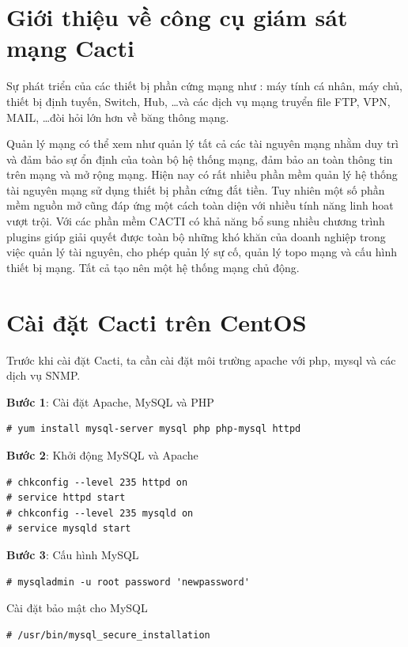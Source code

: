 \documentclass[12pt,oneside,a4paper,reqno]{report}
\begin{document}
\begin{large}
\section{Giới thiệu về công cụ giám sát mạng Cacti}
Sự phát triển của các thiết bị phần cứng mạng như : máy tính cá nhân, máy chủ, thiết bị định tuyến, Switch, Hub, \ldots và các dịch vụ mạng truyển file FTP, VPN, MAIL, \ldots đòi hỏi lớn hơn về băng thông mạng.

Quản lý mạng có thể xem như quản lý tất cả các tài nguyên mạng nhằm duy trì và đảm bảo sự ổn định của toàn bộ hệ thống mạng, đảm bảo an toàn thông tin trên mạng và mở rộng mạng. Hiện nay có rất nhiều phần mềm quản lý hệ thống tài nguyên mạng sử dụng thiết bị phần cứng đắt tiền. Tuy nhiên một số phần mềm nguồn mở cũng đáp ứng một cách toàn diện với nhiều tính năng linh hoat vượt trội. Với các phần mềm CACTI có khả năng bổ sung nhiều chương trình plugins giúp giải quyết được toàn bộ những khó khăn của doanh nghiệp trong việc quản lý tài nguyên, cho phép quản lý sự cố, quản lý topo mạng và cấu hình thiết bị mạng. Tất cả tạo nên một hệ thống mạng chủ động. 
\section{Cài đặt Cacti trên CentOS}
Trước khi cài đặt Cacti, ta cần cài đặt môi trường apache với php, mysql và các dịch vụ SNMP. 

\textbf{Bước 1}: Cài đặt Apache, MySQL và PHP

\begin{lstlisting}
# yum install mysql-server mysql php php-mysql httpd
\end{lstlisting}

\textbf{Bước 2}: Khởi động MySQL và Apache

\begin{lstlisting}
# chkconfig --level 235 httpd on
# service httpd start
# chkconfig --level 235 mysqld on
# service mysqld start
\end{lstlisting}

\textbf{Bước 3}: Cấu hình MySQL

\begin{lstlisting}
# mysqladmin -u root password 'newpassword'
\end{lstlisting}

Cài đặt bảo mật cho MySQL

\begin{lstlisting}
# /usr/bin/mysql_secure_installation
\end{lstlisting}


\end{large}
\end{document}
